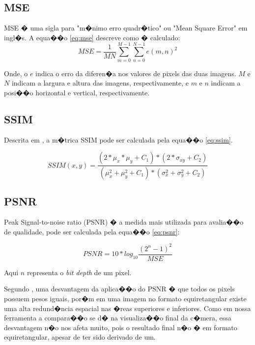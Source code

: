 \documentclass[12pt]{article}
\begin{document}


\subsection{MSE}

MSE � uma sigla para "m�nimo erro quadr�tico" ou "Mean Square Error" em ingl�s. A equa��o \ref{eq:mse} descreve como � calculado:
\begin{equation}
MSE=\frac{1}{MN}\sum_{m=0}^{M-1}{\sum_{n=0}^{N-1}{e(m,n)^2}}
\label{eq:mse}
\end{equation}

Onde, o $e$ indica o erro da diferen�a nos valores de pixels das duas imagens. $M$ e $N$ indicam a largura e altura das imagens, respectivamente, e $m$ e $n$ indicam a posi��o horizontal e vertical, respectivamente.

\subsection{SSIM}

Descrita em \cite{wang2004image}, a m�trica SSIM pode ser calculada pela equa��o \ref{eq:ssim}.

\begin{equation}
SSIM(x,y)=\frac{(2*\mu_x*\mu_y+C_1)*(2*\sigma_{xy}+C_2)}{(\mu^2_x+\mu^2_y+C_1)*(\sigma^2_x+\sigma^2_y+C_2)}
\label{eq:ssim}
\end{equation}

\subsection{PSNR}

Peak Signal-to-noise ratio (PSNR) � a medida mais utilizada para avalia��o de qualidade, pode ser calculada pela equa��o \ref{eq:psnr}:

\begin{equation}
PSNR = 10*log_{10}{\frac{(2^n-1)^2}{MSE}}
\label{eq:psnr}
\end{equation}

Aqui $n$ representa o \textit{bit depth} de um pixel.

Segundo \cite{yu2015framework}, uma desvantagem da aplica��o do PSNR � que todos os pixels possuem pesos iguais, por�m em uma imagem no formato equiretangular existe uma alta redund�ncia espacial nas �reas superiores e inferiores. Como em nossa ferramenta a compara��o se d� na visualiza��o final da c�mera, essa desvantagem n�o nos afeta muito, pois o resultado final n�o � em formato equiretangular, apesar de ter sido derivado de um.
\end{document}
